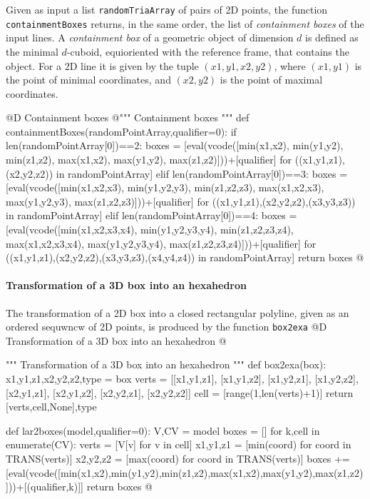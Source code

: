 \documentclass[11pt,oneside]{article}    %
\begin{document}
Given as input a list \texttt{randomTriaArray} of pairs of 2D points, the function \texttt{containmentBoxes} returns, in the same order, the list of \emph{containment boxes} of the input lines. A \emph{containment box} of a geometric object of dimension $d$ is defined as the minimal $d$-cuboid, equioriented with the reference frame, that contains the object. For a 2D line it is given by the tuple $(x1,y1,x2,y2)$, where $(x1,y1)$ is the point of minimal coordinates, and $(x2,y2)$ is the point of maximal  coordinates.

@D Containment boxes
@{""" Containment boxes """
def containmentBoxes(randomPointArray,qualifier=0):
    if len(randomPointArray[0])==2:
        boxes = [eval(vcode([min(x1,x2), min(y1,y2), min(z1,z2), 
                             max(x1,x2), max(y1,y2), max(z1,z2)]))+[qualifier]
                for ((x1,y1,z1),(x2,y2,z2)) in randomPointArray]
    elif len(randomPointArray[0])==3:
        boxes = [eval(vcode([min(x1,x2,x3), min(y1,y2,y3), min(z1,z2,z3), 
                             max(x1,x2,x3), max(y1,y2,y3), max(z1,z2,z3)]))+[qualifier]
                for ((x1,y1,z1),(x2,y2,z2),(x3,y3,z3)) in randomPointArray]
    elif len(randomPointArray[0])==4:
        boxes = [eval(vcode([min(x1,x2,x3,x4), min(y1,y2,y3,y4), min(z1,z2,z3,z4), 
                             max(x1,x2,x3,x4), max(y1,y2,y3,y4), max(z1,z2,z3,z4)]))+[qualifier]
                for ((x1,y1,z1),(x2,y2,z2),(x3,y3,z3),(x4,y4,z4)) in randomPointArray]
    return boxes
@}

    
\paragraph{Transformation of a 3D box into an hexahedron}
The transformation of a 2D box into a closed rectangular polyline, given as an ordered sequwncw of 2D points, is produced by the function \texttt{box2exa}
@D Transformation of a 3D box into an hexahedron
@{""" Transformation of a 3D box into an hexahedron """    
def box2exa(box):
    x1,y1,z1,x2,y2,z2,type = box
    verts = [[x1,y1,z1], [x1,y1,z2], [x1,y2,z1], [x1,y2,z2], [x2,y1,z1], [x2,y1,z2], [x2,y2,z1], [x2,y2,z2]]
    cell = [range(1,len(verts)+1)]
    return [verts,cell,None],type

def lar2boxes(model,qualifier=0):
    V,CV = model
    boxes = []
    for k,cell in enumerate(CV):
        verts = [V[v] for v in cell]
        x1,y1,z1 = [min(coord) for coord in TRANS(verts)]
        x2,y2,z2 = [max(coord) for coord in TRANS(verts)]
        boxes += [eval(vcode([min(x1,x2),min(y1,y2),min(z1,z2),max(x1,x2),max(y1,y2),max(z1,z2)]))+[(qualifier,k)]]
    return boxes
@}
    
\end{document}
